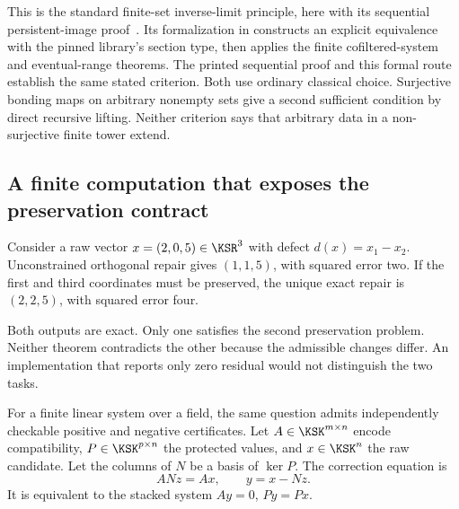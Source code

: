 This is the standard finite-set inverse-limit principle, here with its sequential persistent-image proof~\cite{KS:stacks-limits}. Its formalization in  constructs an explicit equivalence with the pinned library's section type, then applies the finite cofiltered-system and eventual-range theorems. The printed sequential proof and this formal route establish the same stated criterion. Both use ordinary classical choice. Surjective bonding maps on arbitrary nonempty sets give a second sufficient condition by direct recursive lifting. Neither criterion says that arbitrary data in a non-surjective finite tower extend.

\subsection{A finite computation that exposes the preservation contract}
Consider a raw vector \(x=(2,0,5)\in\KSR^3\) with defect \(d(x)=x_1-x_2\). Unconstrained orthogonal repair gives \((1,1,5)\), with squared error two. If the first and third coordinates must be preserved, the unique exact repair is \((2,2,5)\), with squared error four.

Both outputs are exact. Only one satisfies the second preservation problem. Neither theorem contradicts the other because the admissible changes differ. An implementation that reports only zero residual would not distinguish the two tasks.

For a finite linear system over a field, the same question admits independently checkable positive and negative certificates. Let \(A\in\KSK^{m\times n}\) encode compatibility, \(P\in\KSK^{p\times n}\) the protected values, and \(x\in\KSK^n\) the raw candidate. Let the columns of \(N\) be a basis of \(\ker P\). The correction equation is
\[
 ANz=Ax,\qquad y=x-Nz.
\]
It is equivalent to the stacked system \(Ay=0\), \(Py=Px\).

